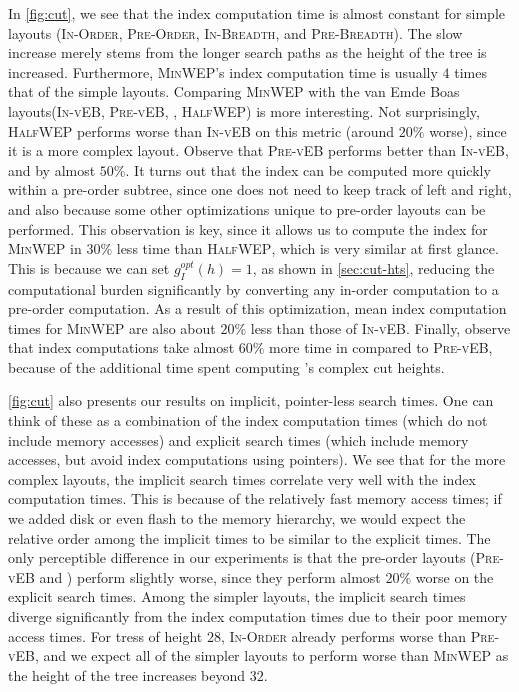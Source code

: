 \documentclass[10pt,conference,letterpaper]{IEEEtran}
\newcommand{\vEBls}{van Emde Boas layouts\xspace}
\newcommand{\pvl}{\textsc{Pre-vEB}\xspace}
\newcommand{\ivl}{\textsc{In-vEB}\xspace}
\newcommand{\preorder}{\textsc{Pre-Order}\xspace}
\newcommand{\inorder}{\textsc{In-Order}\xspace}
\newcommand{\prebreadth}{\textsc{Pre-Breadth}\xspace}
\newcommand{\inbreadth}{\textsc{In-Breadth}\xspace}
\newcommand{\opt}{\ensuremath{\mathit{opt}}\xspace}
\newcommand{\minwep}{\textsc{MinWEP}\xspace}
\newcommand{\halfwep}{\textsc{HalfWEP}\xspace}
\begin{document}
In \autoref{fig:cut}, we see that the index computation time is almost constant for simple layouts (\inorder, \preorder, \inbreadth, and \prebreadth). The slow increase merely stems from the longer search paths as the height of the tree is increased. Furthermore, \minwep's index computation time is usually $4$ times that of the simple layouts. Comparing \minwep with the \vEBls (\ivl, \pvl, \bender, \halfwep) is more interesting. 
Not surprisingly, \halfwep performs worse than \ivl on this metric (around $20\%$ worse), since it is a more complex layout. Observe that \pvl performs better than \ivl, and by almost $50\%$. It turns out that the index can be computed more quickly within a pre-order subtree, since one does not need to keep track of left and right, and also because some other optimizations unique to pre-order layouts can be performed. This observation is key, since it allows us to compute the index for \minwep in $30\%$ less time than \halfwep, which is very similar at first glance. This is because we can set $g_I^\opt(h)=1$, as shown in \autoref{sec:cut-hts}, reducing the computational burden significantly by converting any in-order computation to a pre-order computation. As a result of this optimization, mean index computation times for \minwep are also about $20\%$ less than those of \ivl. Finally, observe that index computations take almost $60\%$ more time in \bender compared to \pvl, because of the additional time spent computing \bender's complex cut heights.

\autoref{fig:cut} also presents our results on implicit, pointer-less search times. One can think of these as a combination of the index computation times (which do not include memory accesses) and explicit search times (which include memory accesses, but avoid index computations using pointers). We see that for the more complex layouts, the implicit search times correlate very well with the index computation times. This is because of the relatively fast memory access times; if we added disk or even flash to the memory hierarchy, we would expect the relative order among the implicit times to be similar to the explicit times. 
The only perceptible difference in our experiments is that the pre-order layouts (\pvl and \bender) perform slightly worse, since they perform almost $20\%$ worse on the explicit search times. 
Among the simpler layouts, the implicit search times diverge significantly from the index computation times due to their poor memory access times. For tress of height $28$, \inorder already performs worse than \pvl, and we expect all of the simpler layouts to perform worse than \minwep as the height of the tree increases beyond $32$.
\end{document}
